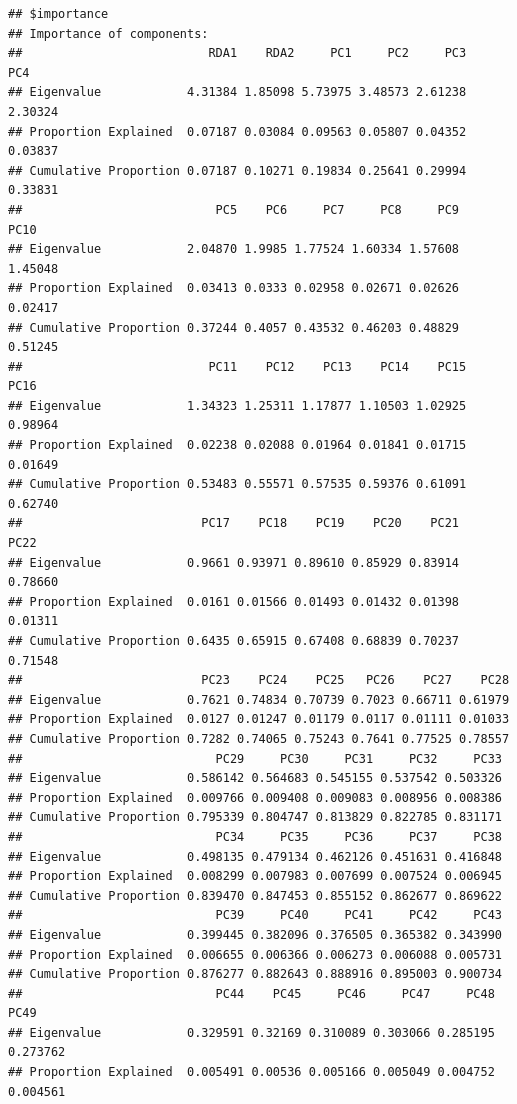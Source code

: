 \documentclass[]{article}
\begin{document}
\begin{verbatim}
## $importance
## Importance of components:
##                          RDA1    RDA2     PC1     PC2     PC3     PC4
## Eigenvalue            4.31384 1.85098 5.73975 3.48573 2.61238 2.30324
## Proportion Explained  0.07187 0.03084 0.09563 0.05807 0.04352 0.03837
## Cumulative Proportion 0.07187 0.10271 0.19834 0.25641 0.29994 0.33831
##                           PC5    PC6     PC7     PC8     PC9    PC10
## Eigenvalue            2.04870 1.9985 1.77524 1.60334 1.57608 1.45048
## Proportion Explained  0.03413 0.0333 0.02958 0.02671 0.02626 0.02417
## Cumulative Proportion 0.37244 0.4057 0.43532 0.46203 0.48829 0.51245
##                          PC11    PC12    PC13    PC14    PC15    PC16
## Eigenvalue            1.34323 1.25311 1.17877 1.10503 1.02925 0.98964
## Proportion Explained  0.02238 0.02088 0.01964 0.01841 0.01715 0.01649
## Cumulative Proportion 0.53483 0.55571 0.57535 0.59376 0.61091 0.62740
##                         PC17    PC18    PC19    PC20    PC21    PC22
## Eigenvalue            0.9661 0.93971 0.89610 0.85929 0.83914 0.78660
## Proportion Explained  0.0161 0.01566 0.01493 0.01432 0.01398 0.01311
## Cumulative Proportion 0.6435 0.65915 0.67408 0.68839 0.70237 0.71548
##                         PC23    PC24    PC25   PC26    PC27    PC28
## Eigenvalue            0.7621 0.74834 0.70739 0.7023 0.66711 0.61979
## Proportion Explained  0.0127 0.01247 0.01179 0.0117 0.01111 0.01033
## Cumulative Proportion 0.7282 0.74065 0.75243 0.7641 0.77525 0.78557
##                           PC29     PC30     PC31     PC32     PC33
## Eigenvalue            0.586142 0.564683 0.545155 0.537542 0.503326
## Proportion Explained  0.009766 0.009408 0.009083 0.008956 0.008386
## Cumulative Proportion 0.795339 0.804747 0.813829 0.822785 0.831171
##                           PC34     PC35     PC36     PC37     PC38
## Eigenvalue            0.498135 0.479134 0.462126 0.451631 0.416848
## Proportion Explained  0.008299 0.007983 0.007699 0.007524 0.006945
## Cumulative Proportion 0.839470 0.847453 0.855152 0.862677 0.869622
##                           PC39     PC40     PC41     PC42     PC43
## Eigenvalue            0.399445 0.382096 0.376505 0.365382 0.343990
## Proportion Explained  0.006655 0.006366 0.006273 0.006088 0.005731
## Cumulative Proportion 0.876277 0.882643 0.888916 0.895003 0.900734
##                           PC44    PC45     PC46     PC47     PC48     PC49
## Eigenvalue            0.329591 0.32169 0.310089 0.303066 0.285195 0.273762
## Proportion Explained  0.005491 0.00536 0.005166 0.005049 0.004752 0.004561

\end{verbatim}
\end{document}
